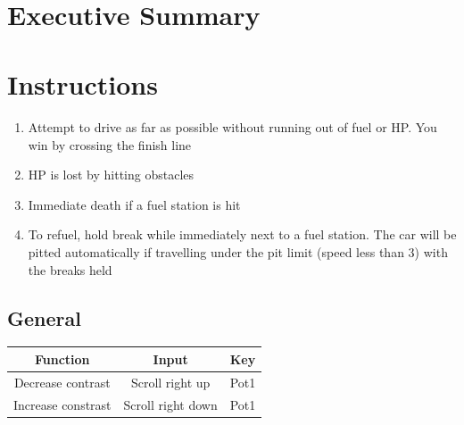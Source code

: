 \documentclass{article}
\title{
\vspace{2in}
\textmd{\huge\textbf{\Class}}\\
\textmd{{\Title}}\\
\vspace{3in}
\textmd{{\AuthorName}}\\
}
\begin{document}
\maketitle
\clearpage

\section*{Executive Summary}

\clearpage



\newpage
\tableofcontents
\newpage

\section{Instructions}
\begin{enumerate}
	\item Attempt to drive as far as possible without running out of fuel or HP. You win by crossing the finish line
	\item HP is lost by hitting obstacles
	\item Immediate death if a fuel station is hit
	\item To refuel, hold break while immediately next to a fuel station. The car will be pitted automatically if travelling under the pit limit (speed less than 3) with the breaks held
\end{enumerate}
\subsection*{General}
\begin{center}
\begin{tabular}{ c c c }
Function 	& Input 		& Key \\ \hline
Decrease contrast	& Scroll right up 	& Pot1	\\
Increase constrast 	& Scroll right down	& Pot1	\\
\end{tabular}
\end{center}
\end{document}
